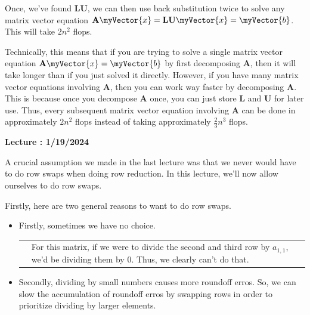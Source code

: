 \documentclass{book}
\newcommand{\hOne}{%
   \color{Black}%
   \fontsize{14}{16}\selectfont%
}
\newcommand{\exOne}{%
   \color{Purple}%
   \fontsize{14}{16}\selectfont%
}
\newenvironment{myIndent}{%
   \begin{adjustwidth}{2.5em}{0em}%
}{%
   \end{adjustwidth}%
}
\newenvironment{myDindent}{%
   \begin{adjustwidth}{5.0em}{0em}%
}{%
   \end{adjustwidth}%
}
\newenvironment{myTindent}{%
   \begin{adjustwidth}{7.5em}{0em}%
}{%
   \end{adjustwidth}%
}
\newcounter{LectureNumber}
\newcommand*{\markLecture}[1]{%
   \stepcounter{LectureNumber}%
   {\huge \color{Black} \textbf{Lecture \theLectureNumber: #1} \newline}%
}
\newcommand{\retTwo}{\hfill\bigbreak}
\newcommand{\mVec}[1]{\myVector{#1}}
\newcommand{\mMat}[1]{\mathbf{#1}}
\begin{document}
\begin{myIndent}
      Once, we've found $\mMat{L}\mMat{U}$, we can then use back substitution twice to solve any matrix vector equation $\mMat{A}\mVec{x} = \mMat{L}\mMat{U}\mVec{x} = \mVec{b}$. This will take $2n^2$ flops. \retTwo

      Technically, this means that if you are trying to solve a single matrix vector equation $\mMat{A}\mVec{x} = \mVec{b}$ by first decomposing $\mMat{A}$, then it will take longer than if you just solved it directly. However, if you have many matrix vector equations involving $\mMat{A}$, then you can work way faster by decomposing $\mMat{A}$. This is because once you decompose $\mMat{A}$ once, you can just store $\mMat{L}$ and $\mMat{U}$ for later use. Thus, every subsequent matrix vector equation involving $\mMat{A}$ can be done in approximately $2n^2$ flops instead of taking approximately $\frac{2}{3}n^3$ flops. \retTwo
   \end{myIndent}
   \newpage

   \hOne
   \markLecture{1/19/2024}

   A crucial assumption we made in the last lecture was that we never would have to do row swaps when doing row reduction. In this lecture, we'll now allow ourselves to do row swaps. \retTwo

   Firstly, here are two general reasons to want to do row swaps.
   
   \begin{itemize}
      \item Firstly, sometimes we have no choice.
      {\begin{myTindent}\begin{myDindent} \exOne
      
         \begin{tabular}{p{0.9in} p{2.5in}}
            \raisebox{-1.5em}{$\begin{bmatrix}
               0 & 4 & 1 \\
               1 & 3 & 4 \\
               2 & 2 & 5
            \end{bmatrix}$} &
            For this matrix, if we were to \newline divide the second and third row by $a_{1,1}$, we'd be dividing them by $0$. Thus, we clearly can't do that.
         \end{tabular}
      \end{myDindent}\end{myTindent}}

      \item Secondly, dividing by small numbers causes more roundoff erros. So, we can slow the accumulation of roundoff erros by swapping rows in order to prioritize dividing by larger elements.
   \end{itemize}
\end{document}
